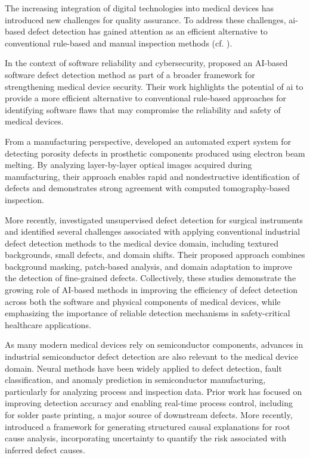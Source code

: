 The increasing integration of digital technologies into medical devices has introduced new challenges for quality assurance. To address these challenges, \gls*{ai}-based defect detection has gained attention as an efficient alternative to conventional rule-based and manual inspection methods (cf. \cite{kim2024deep,bonatti2025expert}).

In the context of software reliability and cybersecurity, \cite{kim2024deep} proposed an AI-based software defect detection method as part of a broader framework for strengthening medical device security. Their work highlights the potential of \gls*{ai} to provide a more efficient alternative to conventional rule-based approaches for identifying software flaws that may compromise the reliability and safety of medical devices.

From a manufacturing perspective, \cite{bonatti2025expert} developed an automated expert system for detecting porosity defects in prosthetic components produced using electron beam melting. By analyzing layer-by-layer optical images acquired during manufacturing, their approach enables rapid and nondestructive identification of defects and demonstrates strong agreement with computed tomography-based inspection.

More recently, \cite{huang2026unsuperviseddefectdetectionsurgical} investigated unsupervised defect detection for surgical instruments and identified several challenges associated with applying conventional industrial defect detection methods to the medical device domain, including textured backgrounds, small defects, and domain shifts. Their proposed approach combines background masking, patch-based analysis, and domain adaptation to improve the detection of fine-grained defects. Collectively, these studies demonstrate the growing role of AI-based methods in improving the efficiency of defect detection across both the software and physical components of medical devices, while emphasizing the importance of reliable detection mechanisms in safety-critical healthcare applications.

As many modern medical devices rely on semiconductor components, advances in industrial semiconductor defect detection are also relevant to the medical device domain. Neural methods have been widely applied to defect detection, fault classification, and anomaly prediction in semiconductor manufacturing, particularly for analyzing process and inspection data. Prior work \cite{lee2017convolutional,khader2018stencil,lu2019realtime,cao2024xscan} has focused on improving detection accuracy and enabling real-time process control, including for solder paste printing, a major source of downstream defects. More recently, \cite{shenoy2026uncertainty} introduced a framework for generating structured causal explanations for root cause analysis, incorporating uncertainty to quantify the risk associated with inferred defect causes.

